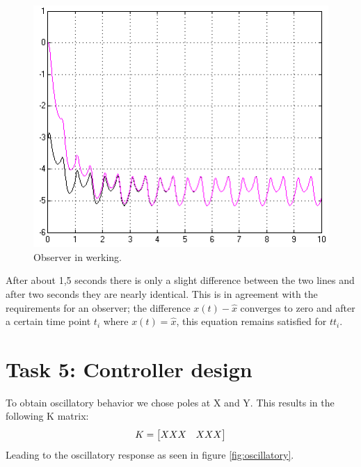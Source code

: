 \documentclass[final]{scrreprt} %
\begin{document}
\begin{figure}[h!]
\centering
\includegraphics[width=\linewidth]{res/observer-res.png}
\caption{Observer in werking.}
\label{fig:simcircuit}
\end{figure}

After about 1,5 seconds there is only a slight difference between the two lines and after two seconds they are nearly identical. This is in agreement with the requirements for an observer; the difference $x(t)-\hat{x}$ converges to zero and after a certain time point $t_i$ where $x(t) = \hat{x}$, this equation remains satisfied for $t$\geq $t_i$.

\section*{Task 5: Controller design}

To obtain oscillatory behavior we chose poles at X and Y. This results in the following K matrix:
\begin{equation}
\centering
K = 
\begin{bmatrix}
  XXX & XXX
\end{bmatrix}
\end{equation}
Leading to the oscillatory response as seen in figure \ref{fig:oscillatory}.
\end{document}

